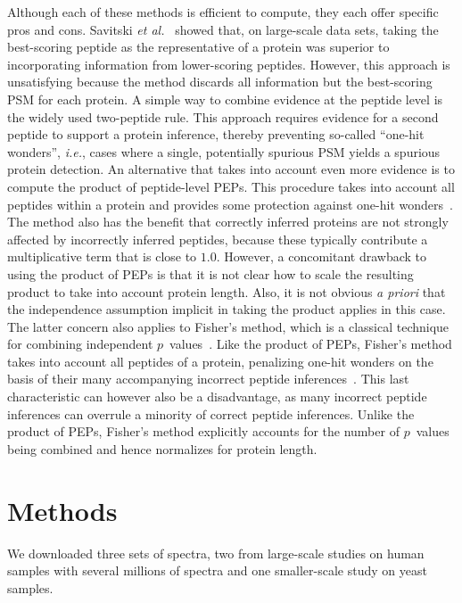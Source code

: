 \documentclass{article}
\begin{document}
Although each of these methods is efficient to compute, they each 
offer specific pros and cons. Savitski {\em et 
al.}~\cite{savitski2015scalable} showed that, on large-scale data 
sets, taking the best-scoring peptide as the representative of a 
protein was superior to incorporating information from lower-scoring 
peptides. However, this approach is unsatisfying because the method 
discards all information but the best-scoring PSM for each protein. A 
simple way to combine evidence at the peptide level is the widely used 
two-peptide rule.  This approach requires evidence for a second 
peptide to support a protein inference, thereby preventing so-called 
``one-hit wonders'', {\em i.e.}, cases where a single, potentially 
spurious PSM yields a spurious protein detection. An alternative that 
takes into account even more evidence is to compute the product of 
peptide-level PEPs. This procedure takes into account all peptides 
within a protein and provides some protection against one-hit 
wonders~\cite{cox2008maxquant}. The method also has the benefit that 
correctly inferred proteins are not strongly affected by incorrectly 
inferred peptides, because these typically contribute a multiplicative 
term that is close to $1.0$. However, a concomitant drawback to using 
the product of PEPs is that it is not clear how to scale the resulting 
product to take into account protein length. Also, it is not obvious 
{\em a priori} that the independence assumption implicit in taking the 
product applies in this case.  The latter concern also applies to 
Fisher's method, which is a classical technique for combining 
independent $p$~values~\cite{fisher1925statistical}. Like the product 
of PEPs, Fisher's method takes into account all peptides of a protein, 
penalizing one-hit wonders on the basis of their many accompanying 
incorrect peptide inferences~\cite{spirin2011assigning, alves2015mass, 
granholm2013determining}.  This last characteristic can however also 
be a disadvantage, as many incorrect peptide inferences can overrule a 
minority of correct peptide inferences.  Unlike the product of PEPs, 
Fisher's method explicitly accounts for the number of $p$~values being 
combined and hence normalizes for protein length.

\section*{Methods}

We downloaded three sets of spectra, two from large-scale studies on
human samples with several millions of spectra and one smaller-scale
study on yeast samples.
\end{document}
